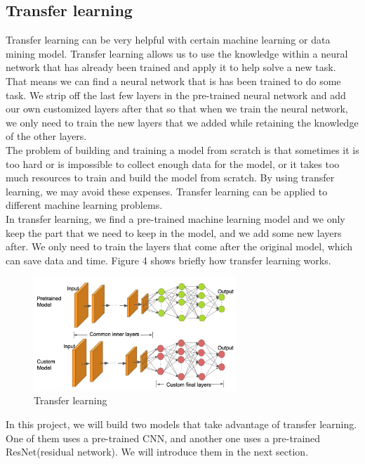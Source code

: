 \documentclass{article}
\begin{document}
\subsection{Transfer learning}
Transfer learning\cite{pan2009survey} can be very helpful with certain machine learning or data mining model. Transfer learning allows us to use the knowledge within a neural network that has already been trained and apply it to help solve a new task. That means we can find a neural network that is has been trained to do some task. We strip off the last few layers in the pre-trained neural network and add our own customized layers after that so that when we train the neural network, we only need to train the new layers that we added while retaining the knowledge of the other layers.\\
The problem of building and training a model from scratch is that sometimes it is too hard or is impossible to collect enough data for the model, or it takes too much resources to train and build the model from scratch. By using transfer learning, we may avoid these expenses. Transfer learning can be applied to different machine learning problems.\\
In transfer learning, we find a pre-trained machine learning model and we only keep the
part that we need to keep in the model, and we add some new layers after. We only
need to train the layers that come after the original model, which can save data and
time. Figure 4 shows briefly how transfer learning works.
\begin{figure}[H]
 \centering
    \includegraphics[width=3.0in]{figs/transfer}
    \caption{Transfer learning}
\end{figure}
In this project, we will build two models that take advantage of transfer learning. One of them uses a pre-trained CNN, and another one uses a pre-trained ResNet(residual network). We will introduce them in the next section.
\end{document}
